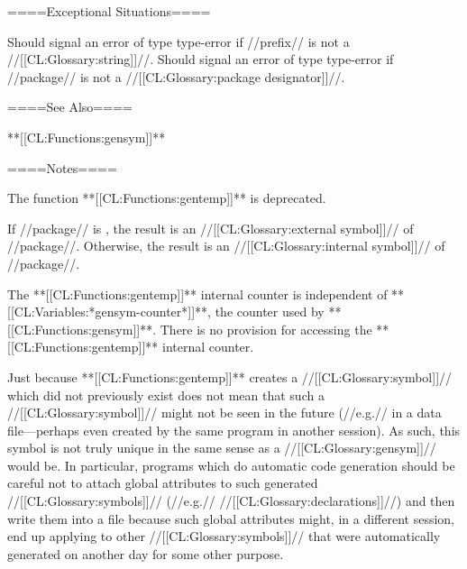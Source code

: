 ====Exceptional Situations====

Should signal an error of type type-error if //prefix// is not a //[[CL:Glossary:string]]//. Should signal an error of type type-error if //package// is not a //[[CL:Glossary:package designator]]//.

====See Also====

**[[CL:Functions:gensym]]**

====Notes====

The function **[[CL:Functions:gentemp]]** is deprecated.

If //package// is , the result is an //[[CL:Glossary:external symbol]]// of //package//. Otherwise, the result is an //[[CL:Glossary:internal symbol]]// of //package//.

The **[[CL:Functions:gentemp]]** internal counter is independent of **[[CL:Variables:*gensym-counter*]]**, the counter used by **[[CL:Functions:gensym]]**. There is no provision for accessing the **[[CL:Functions:gentemp]]** internal counter.

Just because **[[CL:Functions:gentemp]]** creates a //[[CL:Glossary:symbol]]// which did not previously exist does not mean that such a //[[CL:Glossary:symbol]]// might not be seen in the future (//e.g.// in a data file---perhaps even created by the same program in another session). As such, this symbol is not truly unique in the same sense as a //[[CL:Glossary:gensym]]// would be. In particular, programs which do automatic code generation should be careful not to attach global attributes to such generated //[[CL:Glossary:symbols]]// (//e.g.//  //[[CL:Glossary:declarations]]//) and then write them into a file because such global attributes might, in a different session, end up applying to other //[[CL:Glossary:symbols]]// that were automatically generated on another day for some other purpose.

